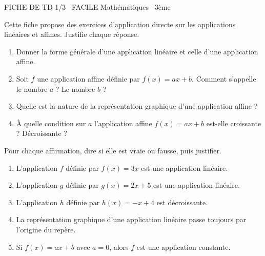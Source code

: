 \documentclass[11pt]{article}
\begin{document}
\begin{tcolorbox}[enhanced,colback=popink,colframe=popink,arc=10pt,boxrule=0pt,left=12pt,right=12pt,top=9pt,bottom=9pt]
{\color{white}\popxbold\small FICHE DE TD 1/3 \textbullet\ FACILE \hfill Mathématiques \textbullet\ 3ème\par}
\end{tcolorbox}
\vspace{4pt}
Cette fiche propose des exercices d'application directe sur les applications linéaires et affines. Justifie chaque réponse.

\begin{exercice}
\begin{enumerate}
\item Donner la forme générale d'une application linéaire et celle d'une application affine.
\item Soit $f$ une application affine définie par $f(x)=ax+b$. Comment s'appelle le nombre $a$ ? Le nombre $b$ ?
\item Quelle est la nature de la représentation graphique d'une application affine ?
\item À quelle condition sur $a$ l'application affine $f(x)=ax+b$ est-elle croissante ? Décroissante ?
\end{enumerate}
\end{exercice}

\begin{exercice}
Pour chaque affirmation, dire si elle est vraie ou fausse, puis justifier.
\begin{enumerate}
\item L'application $f$ définie par $f(x)=3x$ est une application linéaire.
\item L'application $g$ définie par $g(x)=2x+5$ est une application linéaire.
\item L'application $h$ définie par $h(x)=-x+4$ est décroissante.
\item La représentation graphique d'une application linéaire passe toujours par l'origine du repère.
\item Si $f(x)=ax+b$ avec $a=0$, alors $f$ est une application constante.
\end{enumerate}
\end{exercice}
\end{document}
